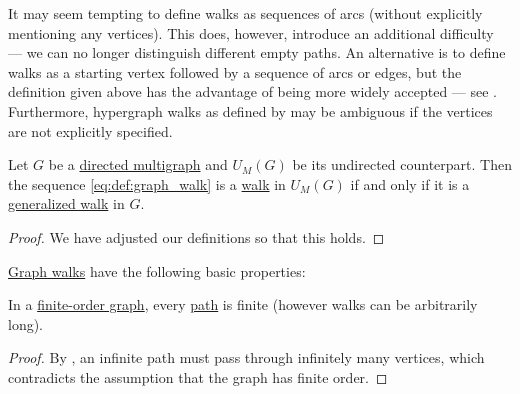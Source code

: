 \begin{comments}
  \item It may seem tempting to define walks as sequences of arcs (without explicitly mentioning any vertices). This does, however, introduce an additional difficulty --- we can no longer distinguish different empty paths. An alternative is to define walks as a starting vertex followed by a sequence of arcs or edges, but the definition given above has the advantage of being more widely accepted --- see . Furthermore, hypergraph walks as defined by \cite[300]{ЕмеличевИПр1990Графы} may be ambiguous if the vertices are not explicitly specified.
\end{comments}

\begin{proposition}\label{thm:walk_in_undirected_counterpart}
  Let \( G \) be a \hyperref[def:directed_multigraph]{directed multigraph} and \( \hyperref[def:graph_functors/multi_forgetful]{U_M}(G) \) be its undirected counterpart. Then the sequence \eqref{eq:def:graph_walk} is a \hyperref[def:graph_walk/undirected]{walk} in \( \hyperref[def:graph_functors/multi_forgetful]{U_M}(G) \) if and only if it is a \hyperref[def:graph_walk/generalized]{generalized walk} in \( G \).
\end{proposition}
\begin{proof}
  We have adjusted our definitions so that this holds.
\end{proof}

\begin{proposition}\label{thm:def:graph_walk}
  \hyperref[def:graph_walk]{Graph walks} have the following basic properties:
  \begin{thmenum}
     In a \hyperref[def:graph_cardinality/order]{finite-order graph}, every \hyperref[def:graph_walk/path]{path} is finite (however walks can be arbitrarily long).
  \end{thmenum}
\end{proposition}
\begin{proof}
   By , an infinite path must pass through infinitely many vertices, which contradicts the assumption that the graph has finite order.
\end{proof}


